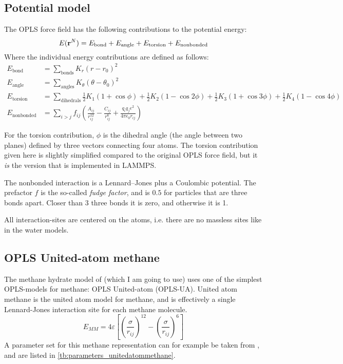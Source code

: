 \subsection{Potential model}
The OPLS force field has the following contributions to the potential energy:
\begin{equation}
	E(\mathbf{r}^N) = E_{\text{bond}} + E_{\text{angle}} + E_{\text{torsion}} + E_{\text{nonbonded}} 
\end{equation}
Where the individual energy contributions are defined as follows:
\begin{align}
	E_{\text{bond}} & = \sum_{\text{bonds}} K_r (r-r_0)^2 \\
	E_{\text{angle}} & = \sum_{\text{angles}} K_{\theta} (\theta-\theta_0)^2 \\
	E_{\text{torsion}} & = \sum_{\text{dihedrals}} \frac{1}{2}K_1(1+\cos\phi) + \frac{1}{2}K_2(1-\cos 2\phi) + \frac{1}{2}K_3(1+\cos 3\phi) + \frac{1}{2}K_4(1-\cos 4\phi) \\
	E_{\text{nonbonded}} & = \sum_{i>j} f_{ij} \left(\frac{A_{ij}}{r_{ij}^{12}} - \frac{C_{ij}}{r_{ij}^{6}}+ \frac{q_iq_je^2}{4\pi\epsilon_0 r_{ij}}\right)
\end{align}

For the torsion contribution, $\phi$ is the dihedral angle (the angle between two planes) defined by three vectors connecting four atoms. The torsion contribution given here is slightly simplified compared to the original OPLS force field, but it \emph{is} the version that is implemented in LAMMPS.

The nonbonded interaction is a Lennard--Jones plus a Coulombic potential. The prefactor $f$ is the so-called \emph{fudge factor}, and is $0.5$ for particles that are three bonds apart. Closer than 3 three bonds it is zero, and otherwise it is 1.

All interaction-sites are centered on the atoms, i.e. there are no massless sites like in the water models.

\subsection{OPLS United-atom methane}
The methane hydrate model of \citet{Walsh2009}  (which I am going to use) uses one of the simplest OPLS-models for methane: OPLS United-atom (OPLS-UA). United atom methane is the united atom model for methane, and is effectively a single Lennard-Jones interaction site for each methane molecule. 
\begin{equation}
	E_{MM} = 4\varepsilon\left[\left(\frac{\sigma}{r_{ij}}\right)^{12} - \left(\frac{\sigma}{r_{ij}}\right)^{6}\right]
	\label{eq:part1:lennardjonespotentialmethane}
\end{equation}
A parameter set for this methane representation can for example be taken from \cite{Martin1998}, and are listed in \ref{tb:parameters_unitedatommethane}. 

